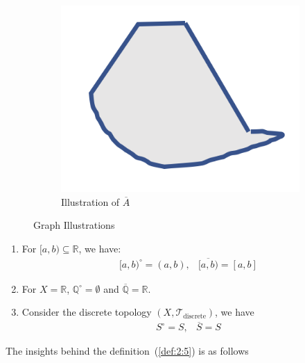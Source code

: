 \begin{definition}
\begin{figure}[H]
        \begin{subfigure}[b]{0.3\textwidth}
                \centering
                \includegraphics[width=\textwidth]{week2/p_3}
                \caption{Illustration of $\overline{A}$}
                \label{fig:tiger}
        \end{subfigure}
        \caption{Graph Illustrations}\label{fig:animals}
\end{figure}
\end{definition}
\begin{example}
\begin{enumerate}
\item

For $[a,b)\subseteq\mathbb{R}$, we have:
\[
\begin{array}{ll}
[a,b)^\circ=(a,b),
&
\overline{[a,b)}=[a,b]
\end{array}
\]

\item
For $X=\mathbb{R}$, $\mathbb{Q}^\circ=\emptyset$ and $\overline{\mathbb{Q}}=\mathbb{R}$.

\item
Consider the discrete topology $(X,\mathcal{T}_{\text{discrete}})$, we have
\[
\begin{array}{ll}
S^\circ=S,
&
\overline{S}=S
\end{array}
\]

\end{enumerate}
\end{example}

The insights behind the definition~(\ref{def:2:5}) is as follows

